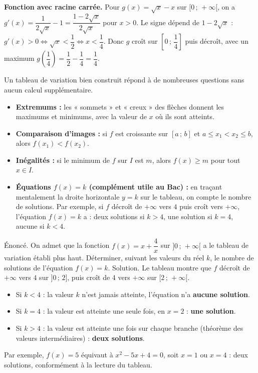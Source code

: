 \documentclass[11pt]{article}
\newcounter{popsec}
\newcounter{popsub}
\newcommand{\courssub}[1]{%
  \stepcounter{popsub}%
  \par\vspace{9pt}\noindent{\popxbold\fontsize{11.5}{13}\selectfont\color{popink}{\color{poporange}\thepopsec.\thepopsub}\hspace{6pt}#1}\par\nopagebreak\vspace{4pt}
}
\begin{document}
\textbf{Fonction avec racine carrée.} Pour $g(x) = \sqrt{x} - x$ sur $[0\,;\,+\infty[$, on a $g'(x) = \dfrac{1}{2\sqrt{x}} - 1 = \dfrac{1 - 2\sqrt{x}}{2\sqrt{x}}$ pour $x > 0$. Le signe dépend de $1 - 2\sqrt{x}$ : $g'(x) > 0 \iff \sqrt{x} < \dfrac{1}{2} \iff x < \dfrac{1}{4}$. Donc $g$ croît sur $\left[0\,;\,\dfrac{1}{4}\right]$ puis décroît, avec un maximum $g\left(\dfrac{1}{4}\right) = \dfrac{1}{2} - \dfrac{1}{4} = \dfrac{1}{4}$.

\courssub{Lire un tableau de variation}

Un tableau de variation bien construit répond à de nombreuses questions sans aucun calcul supplémentaire.

\begin{propriete}
\begin{itemize}
\item \textbf{Extremums :} les « sommets » et « creux » des flèches donnent les maximums et minimums, avec la valeur de $x$ où ils sont atteints.
\item \textbf{Comparaison d'images :} si $f$ est croissante sur $[a\,;\,b]$ et $a \leq x_1 < x_2 \leq b$, alors $f(x_1) < f(x_2)$.
\item \textbf{Inégalités :} si le minimum de $f$ sur $I$ est $m$, alors $f(x) \geq m$ pour tout $x \in I$.
\item \textbf{Équations $f(x) = k$ (complément utile au Bac) :} en traçant mentalement la droite horizontale $y = k$ sur le tableau, on compte le nombre de solutions. Par exemple, si $f$ décroît de $+\infty$ vers $4$ puis croît vers $+\infty$, l'équation $f(x) = k$ a : deux solutions si $k > 4$, une solution si $k = 4$, aucune si $k < 4$.
\end{itemize}
\end{propriete}

\begin{exoresolu}
Énoncé. On admet que la fonction $f(x) = x + \dfrac{4}{x}$ sur $]0\,;\,+\infty[$ a le tableau de variation établi plus haut. Déterminer, suivant les valeurs du réel $k$, le nombre de solutions de l'équation $f(x) = k$.
\tcblower
Solution. Le tableau montre que $f$ décroît de $+\infty$ vers $4$ sur $]0\,;\,2]$, puis croît de $4$ vers $+\infty$ sur $[2\,;\,+\infty[$.
\begin{itemize}
\item Si $k < 4$ : la valeur $k$ n'est jamais atteinte, l'équation n'a \textbf{aucune solution}.
\item Si $k = 4$ : la valeur est atteinte une seule fois, en $x = 2$ : \textbf{une solution}.
\item Si $k > 4$ : la valeur est atteinte une fois sur chaque branche (théorème des valeurs intermédiaires) : \textbf{deux solutions}.
\end{itemize}
Par exemple, $f(x) = 5$ équivaut à $x^2 - 5x + 4 = 0$, soit $x = 1$ ou $x = 4$ : deux solutions, conformément à la lecture du tableau.
\end{exoresolu}
\end{document}
